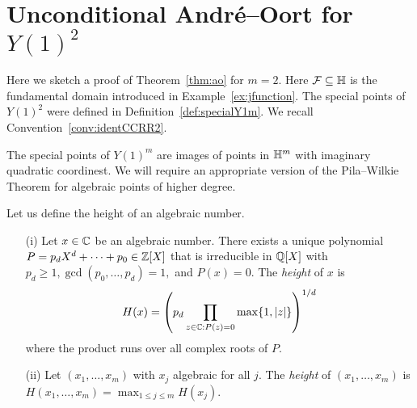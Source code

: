 \section{Unconditional Andr\'e--Oort for $Y(1)^2$}

Here we sketch a proof of Theorem~\ref{thm:ao} for $m=2$. Here ${\mathcal F}
\subseteq{\mathbb{H}}$ is the fundamental domain introduced in
Example~\ref{ex:jfunction}. The special points of $Y(1)^2$ were
defined in Definition~\ref{def:specialY1m}. We recall
Convention~\ref{conv:identCCRR2}. 


The special points of $Y(1)^m$ are images of points in ${\mathbb{H}}^m$ with
imaginary quadratic coordinest.
We will require an appropriate version of the Pila--Wilkie
Theorem for algebraic points of higher degree.

Let us define the height of an algebraic number.

\begin{definition}
  \label{def:height2}  
  \begin{enumerate}
  \item [(i)] Let $x\in{\mathbb{C}}$ be an algebraic number. There exists
    a unique polynomial $P=p_dX^d+\cdots+p_0\in {\mathbb{Z}}[X]$ that is
    irreducible in ${\mathbb{Q}}[X]$ with $p_d\ge
    1,
    \gcd(p_0,\ldots,p_d)=1,$ and $P(x)=0$. The \emph{height} of $x$
    is
    \begin{equation*}
      H(x) = \left(p_d \prod_{z\in {\mathbb{C}} : P(z)=0} \max\{1,|z|\}\right)^{1/d}
    \end{equation*}
    where the product runs over all complex roots of $P$.
  \item[(ii)] Let $(x_1,\ldots,x_m)$ with $x_j$
    algebraic for all $j$. The \emph{height} of
    $(x_1,\ldots,x_m)$ is
    $H(x_1,\ldots,x_m) = \max_{1\le j\le m}H(x_j)$. 
  \end{enumerate}
\end{definition}

